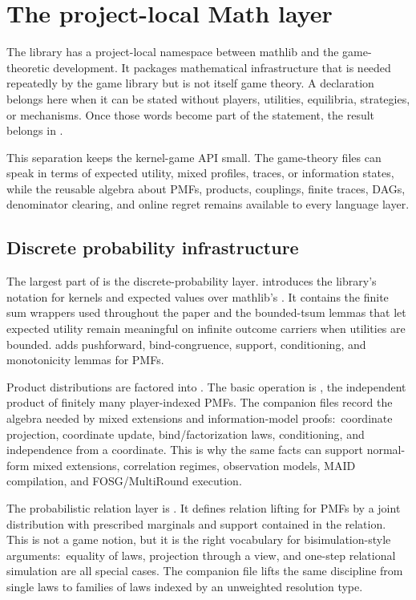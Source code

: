 \section{The project-local Math layer}
\label{sec:math-layer}

The library has a project-local  namespace between
mathlib and the game-theoretic development.  It packages
mathematical infrastructure that is needed repeatedly by the game
library but is not itself game theory.  A declaration belongs here
when it can be stated without players, utilities, equilibria,
strategies, or mechanisms.  Once those words become part of the
statement, the result belongs in .

This separation keeps the kernel-game API small.  The game-theory
files can speak in terms of expected utility, mixed profiles, traces,
or information states, while the reusable algebra about PMFs,
products, couplings, finite traces, DAGs, denominator clearing, and
online regret remains available to every language layer.

\subsection{Discrete probability infrastructure}
\label{sec:math-layer:probability}

The largest part of  is the discrete-probability layer.
 introduces the library's notation for kernels
and expected values over mathlib's .  It contains the finite
sum wrappers used throughout the paper and the bounded-tsum lemmas
that let expected utility remain meaningful on infinite outcome
carriers when utilities are bounded.  
adds pushforward, bind-congruence, support, conditioning, and
monotonicity lemmas for PMFs.

Product distributions are factored into .  The
basic operation is , the independent product of finitely
many player-indexed PMFs.  The companion files record the algebra
needed by mixed extensions and information-model proofs:\ coordinate
projection, coordinate update, bind/factorization laws,
conditioning, and independence from a coordinate.  This is why the
same  facts can support normal-form mixed extensions,
correlation regimes, observation models, MAID compilation, and
FOSG/MultiRound execution.

The probabilistic relation layer is .  It defines
relation lifting for PMFs by a joint distribution with prescribed
marginals and support contained in the relation.  This is not a game
notion, but it is the right vocabulary for bisimulation-style
arguments:\ equality of laws, projection through a view, and
one-step relational simulation are all special cases.  The companion
 file lifts the same discipline
from single laws to families of laws indexed by an unweighted
resolution type.

